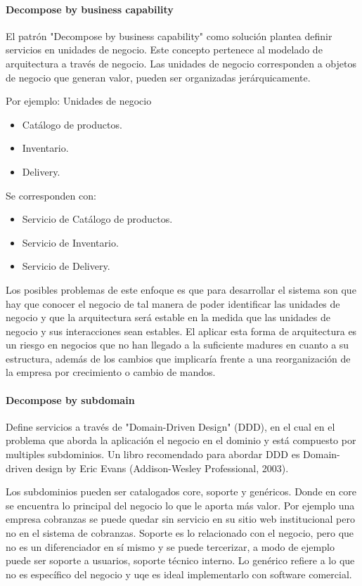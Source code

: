 \paragraph{Decompose by business capability}
El patrón "Decompose by business capability" como solución plantea definir servicios en unidades de negocio. Este concepto pertenece al modelado de arquitectura a través de negocio. 
Las unidades de negocio corresponden a objetos de negocio que generan valor, pueden ser organizadas jerárquicamente.\par
Por ejemplo:
Unidades de negocio 
\begin{itemize}
    \item Catálogo de productos.
    \item Inventario.
    \item Delivery.
\end{itemize}
Se corresponden con:
\begin{itemize}
    \item Servicio de Catálogo de productos.
    \item Servicio de Inventario.
    \item Servicio de Delivery.
\end{itemize}
Los posibles problemas de este enfoque es que para desarrollar el sistema son que hay que conocer el negocio de tal manera de poder identificar las unidades de negocio y que la arquitectura será estable en la medida que las unidades de negocio y sus interacciones sean estables. El aplicar esta forma de arquitectura es un riesgo en negocios que no han llegado a la suficiente madures en cuanto a su estructura, además de los cambios que implicaría frente a una reorganización de la empresa por crecimiento o cambio de mandos.\par

\paragraph{Decompose by subdomain}
Define servicios a través de "Domain-Driven Design" (DDD), en el cual en el problema que aborda la aplicación el negocio en el dominio y está compuesto por multiples subdominios. Un libro recomendado para abordar DDD es Domain-driven design by Eric Evans (Addison-Wesley Professional, 2003).\par

Los subdominios pueden ser catalogados core, soporte y genéricos. Donde en core se encuentra lo principal del negocio lo que le aporta más valor. Por ejemplo una empresa cobranzas se puede quedar sin servicio en su sitio web institucional pero no en el sistema de cobranzas. Soporte es lo relacionado con el negocio, pero que no es un diferenciador en sí mismo y se puede tercerizar, a modo de ejemplo puede ser soporte a usuarios, soporte técnico interno. Lo genérico refiere a lo que no es específico del negocio y uqe es ideal implementarlo con software comercial.\par


